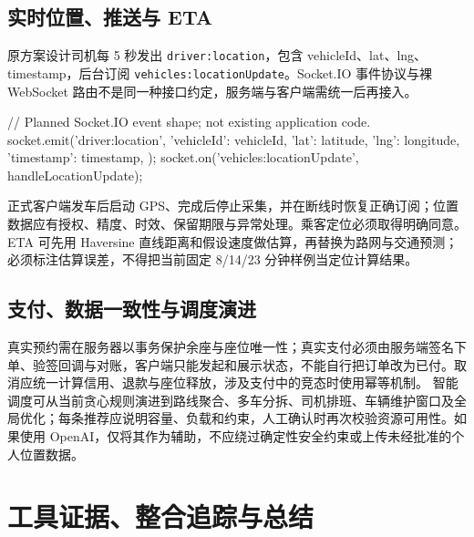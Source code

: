 \documentclass[UTF8,fontset=fandol,zihao=-4,oneside]{ctexrep}
\begin{document}
\section{实时位置、推送与 ETA}
原方案设计司机每 5 秒发出 \texttt{driver:location}，包含 vehicleId、lat、lng、timestamp，后台订阅 \texttt{vehicles:locationUpdate}。Socket.IO 事件协议与裸 WebSocket 路由不是同一种接口约定，服务端与客户端需统一后再接入。
\begin{code}
// Planned Socket.IO event shape; not existing application code.
socket.emit('driver:location', {
  'vehicleId': vehicleId,
  'lat': latitude,
  'lng': longitude,
  'timestamp': timestamp,
});
socket.on('vehicles:locationUpdate', handleLocationUpdate);
\end{code}
正式客户端发车后启动 GPS、完成后停止采集，并在断线时恢复正确订阅；位置数据应有授权、精度、时效、保留期限与异常处理。乘客定位必须取得明确同意。ETA 可先用 Haversine 直线距离和假设速度做估算，再替换为路网与交通预测；必须标注估算误差，不得把当前固定 8/14/23 分钟样例当定位计算结果。

\section{支付、数据一致性与调度演进}
真实预约需在服务器以事务保护余座与座位唯一性；真实支付必须由服务端签名下单、验签回调与对账，客户端只能发起和展示状态，不能自行把订单改为已付。取消应统一计算信用、退款与座位释放，涉及支付中的竞态时使用幂等机制。
智能调度可从当前贪心规则演进到路线聚合、多车分拆、司机排班、车辆维护窗口及全局优化；每条推荐应说明容量、负载和约束，人工确认时再次校验资源可用性。如果使用 OpenAI，仅将其作为辅助，不应绕过确定性安全约束或上传未经批准的个人位置数据。

\chapter{工具证据、整合追踪与总结}
\end{document}
